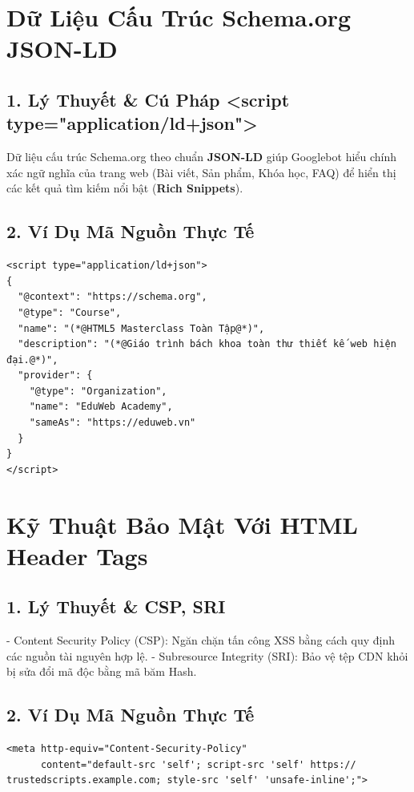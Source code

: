 \documentclass[11pt,oneside]{book}
\newcommand{\term}[1]{\textbf{\textcolor{primaryBlue}{#1}}}
\begin{document}
\section{Dữ Liệu Cấu Trúc Schema.org JSON-LD}
\subsection{1. Lý Thuyết \& Cú Pháp <script type="application/ld+json">}
Dữ liệu cấu trúc Schema.org theo chuẩn \textbf{JSON-LD} giúp Googlebot hiểu chính xác ngữ nghĩa của trang web (Bài viết, Sản phẩm, Khóa học, FAQ) để hiển thị các kết quả tìm kiếm nổi bật (\term{Rich Snippets}).

\subsection{2. Ví Dụ Mã Nguồn Thực Tế}
\begin{lstlisting}[language=HTML5, caption={Ví dụ khai báo dữ liệu cấu trúc Khóa Học chuẩn Google Rich Results}]
<script type="application/ld+json">
{
  "@context": "https://schema.org",
  "@type": "Course",
  "name": "(*@HTML5 Masterclass Toàn Tập@*)",
  "description": "(*@Giáo trình bách khoa toàn thư thiết kế web hiện đại.@*)",
  "provider": {
    "@type": "Organization",
    "name": "EduWeb Academy",
    "sameAs": "https://eduweb.vn"
  }
}
</script>
\end{lstlisting}

\section{Kỹ Thuật Bảo Mật Với HTML Header Tags}
\subsection{1. Lý Thuyết \& CSP, SRI}
- Content Security Policy (CSP): Ngăn chặn tấn công XSS bằng cách quy định các nguồn tài nguyên hợp lệ.
- Subresource Integrity (SRI): Bảo vệ tệp CDN khỏi bị sửa đổi mã độc bằng mã băm Hash.

\subsection{2. Ví Dụ Mã Nguồn Thực Tế}
\begin{lstlisting}[language=HTML5, caption={Ví dụ cấu hình Content Security Policy trong thẻ meta}]
<meta http-equiv="Content-Security-Policy" 
      content="default-src 'self'; script-src 'self' https:// trustedscripts.example.com; style-src 'self' 'unsafe-inline';">
\end{lstlisting}
\end{document}
